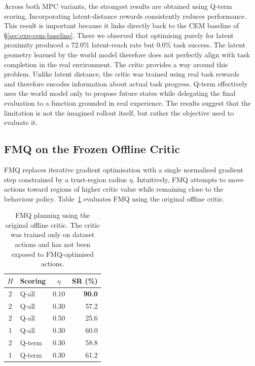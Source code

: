 Across both MPC variants, the strongest results are obtained using
Q-term scoring. Incorporating latent-distance rewards consistently
reduces performance.
This result is important because it links directly back to the CEM
baseline of \S\ref{sec:exp-cem-baseline}. There we observed that
optimising purely for latent proximity produced a $72.0\%$
latent-reach rate but $0.0\%$ task success. The latent geometry learned
by the world model therefore does not perfectly align with task
completion in the real environment.
The critic provides a way around this problem. Unlike latent distance,
the critic was trained using real task rewards and therefore encodes
information about actual task progress. Q-term effectively uses the
world model only to propose future states while delegating the final
evaluation to a function grounded in real experience.
The results suggest that the limitation is not the imagined rollout
itself, but rather the objective used to evaluate it.

\subsection{FMQ on the Frozen Offline Critic}
\label{sec:exp-fmq-base}

FMQ replaces iterative gradient optimisation with a single
normalised gradient step constrained by a trust-region radius
$\eta$. Intuitively, FMQ attempts to move actions toward regions of
higher critic value while remaining close to the behaviour policy.
Table~\ref{tab:mpc-fmq-basepolicy} evaluates FMQ using the original
offline critic.

\begin{table}[h]
\centering
\caption{FMQ planning using the original offline critic.
The critic was trained only on dataset actions and has not been
exposed to FMQ-optimised actions.}
\label{tab:mpc-fmq-basepolicy}
\begin{tabular}{c l c r}
\toprule
$H$ & Scoring & $\eta$ & SR (\%) \\
\midrule
2 & Q-all  & 0.10 & \textbf{90.0} \\
2 & Q-all  & 0.30 & 57.2 \\
2 & Q-all  & 0.50 & 25.6 \\
1 & Q-all  & 0.30 & 60.0 \\
2 & Q-term & 0.30 & 58.8 \\
1 & Q-term & 0.30 & 61.2 \\
\bottomrule
\end{tabular}
\end{table}

